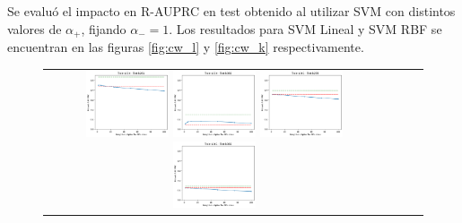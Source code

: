 Se evaluó el impacto en R-AUPRC en test obtenido al utilizar SVM con distintos valores de $\alpha_{+}$, fijando $\alpha_{-}=1$. Los resultados para SVM Lineal y SVM RBF se encuentran en las figuras \ref{fig:cw_l} y \ref{fig:cw_k} respectivamente. \\

\begin{figure}[h!]
\begin{tabular}{cccc}
  \includegraphics[width=0.25\textwidth]{Kap7/cw/train=b234_test=b261_linear_individual_curves.png}  \includegraphics[width=0.25\textwidth]{Kap7/cw/train=b234_test=b360_linear_individual_curves.png}
  \includegraphics[width=0.25\textwidth]{Kap7/cw/train=b261_test=b278_linear_individual_curves.png}  \includegraphics[width=0.25\textwidth]{Kap7/cw/train=b261_test=b360_linear_individual_curves.png} \\


\end{tabular}
\end{figure}
